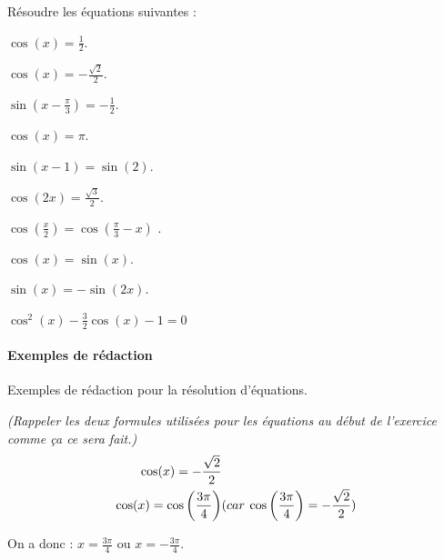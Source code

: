 \documentclass{article}
\begin{document}
\begin{exercice}[\'Equations]
	Résoudre les équations suivantes :
	\begin{multicols}{2}
		\begin{questions}
			\item $\cos(x) = \frac{1}{2}$.
			\item $\cos(x) = -\frac{\sqrt{2}}{2}$.
			\item $\sin(x - \frac{\pi}{3}) = -\frac{1}{2}$.
			\item $\cos(x) = \pi$.
			\item $\sin(x-1) = \sin(2)$.
			\item $\cos(2x) = \frac{\sqrt{3}}{2}$.
			\item $\cos(\frac{x}{2}) = \cos(\frac{\pi}{3}-x)$ .
			\item $\cos(x) = \sin(x)$.
			\item $\sin(x) = -\sin(2x)$.
			\item $\cos^2(x)-\frac{3}{2}\cos(x)-1 = 0$
		\end{questions}
	\end{multicols}
	
\paragraph*{Exemples de rédaction}

Exemples de rédaction pour la résolution d'équations.

\emph{(Rappeler les deux formules utilisées pour les équations au début de l'exercice comme ça ce sera fait.)}\\



\begin{eqnarray*}
\cos(x)  =  -\frac{\sqrt{2}}{2} &\\
\cos(x)  =  \cos\left(\frac{3\pi}{4}\right) & (car\: \cos\left(\frac{3\pi}{4}\right) = -\frac{\sqrt{2}}{2})
\end{eqnarray*}


\begin{center}
On a donc :  $x = \frac{3\pi}{4}$ ou $x = -\frac{3\pi}{4}$.
\end{center}








\end{exercice}	
\end{document}
